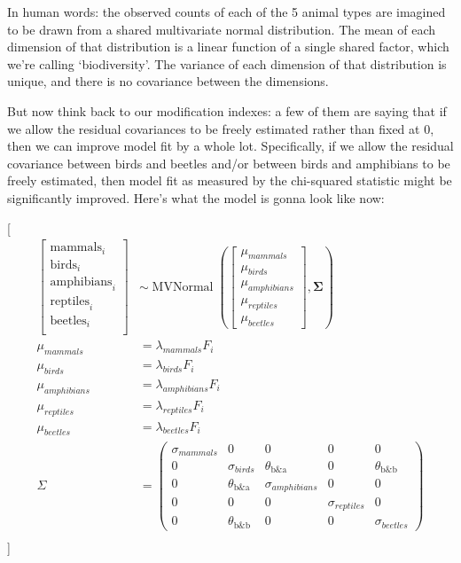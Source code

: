 \documentclass[
  letterpaper,
  DIV=11,
  numbers=noendperiod]{scrreprt}
\begin{document}
In human words: the observed counts of each of the 5 animal types are
imagined to be drawn from a shared multivariate normal distribution. The
mean of each dimension of that distribution is a linear function of a
single shared factor, which we're calling `biodiversity'. The variance
of each dimension of that distribution is unique, and there is no
covariance between the dimensions.

But now think back to our modification indexes: a few of them are saying
that if we allow the residual covariances to be freely estimated rather
than fixed at 0, then we can improve model fit by a whole lot.
Specifically, if we allow the residual covariance between birds and
beetles and/or between birds and amphibians to be freely estimated, then
model fit as measured by the chi-squared statistic might be
significantly improved. Here's what the model is gonna look like now:

{[} \begin{align*}
\begin{bmatrix} \text{mammals}_i \\ \text{birds}_i \\ \text{amphibians}_i \\ \text{reptiles}_i \\ \text{beetles}_i \\ \end{bmatrix} & \sim
\operatorname{MVNormal} \left( \begin{bmatrix} \mu_{mammals} \\ \mu_{birds} \\ \mu_{amphibians} \\ \mu_{reptiles} \\ \mu_{beetles} \end{bmatrix}, \mathbf{\Sigma} \right)\\
\mu_{mammals} & = \lambda_{mammals} F_i \\
\mu_{birds} & = \lambda_{birds} F_i \\
\mu_{amphibians} & = \lambda_{amphibians} F_i \\
\mu_{reptiles} & = \lambda_{reptiles} F_i \\
\mu_{beetles} & = \lambda_{beetles} F_i \\
\Sigma & = \begin{pmatrix} 
\sigma_{mammals}&0 &0 &0 &0 \\ 
0 & \sigma_{birds} &\theta_\text{b\&a} &0 &\theta_\text{b\&b} \\ 
0 &\theta_\text{b\&a} & \sigma_{amphibians} &0 &0 \\ 
0 & 0 & 0 & \sigma_{reptiles} &0 \\ 
0 &\theta_\text{b\&b} & 0 & 0 & \sigma_{beetles} 
\end{pmatrix} \\
\end{align*} {]}
\end{document}

